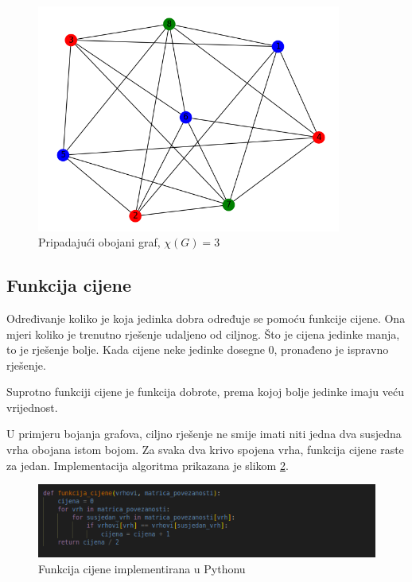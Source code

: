 \documentclass[times, utf8, zavrsni]{fer}
\begin{document}
\begin{figure}[htb]
\centering
\includegraphics[width=10cm]{images/genom_encoding_graph.png}
\caption{Pripadajući obojani graf, $\chi(G)=3$}
\label{fig:kodiranje genoma graf}
\end{figure}

\subsection{Funkcija cijene}
\label{sec:funkcija cijene}
Određivanje koliko je koja jedinka dobra određuje se pomoću funkcije cijene. Ona mjeri koliko je trenutno rješenje udaljeno od ciljnog. Što je cijena jedinke manja, to je rješenje bolje. Kada cijene neke jedinke dosegne 0, pronađeno je ispravno rješenje.

Suprotno funkciji cijene je funkcija dobrote, prema kojoj bolje jedinke imaju veću vrijednost.

U primjeru bojanja grafova, ciljno rješenje ne smije imati niti jedna dva susjedna vrha obojana istom bojom. Za svaka dva krivo spojena vrha, funkcija cijene raste za jedan. Implementacija algoritma prikazana je slikom \ref{fig:funkcija cijene}.

\begin{figure}[htb]
\centering
\includegraphics[width=12cm]{images/funkcija_cijene.png}
\caption{Funkcija cijene implementirana u Pythonu}
\label{fig:funkcija cijene}
\end{figure}
\end{document}

